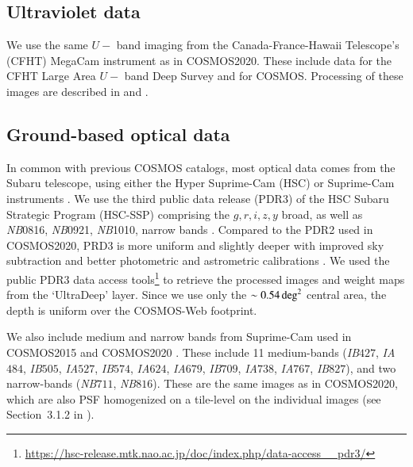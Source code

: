 \documentclass[longauth]{aa}
\begin{document}
\subsection{Ultraviolet data}
We use the same $U-$ band imaging from the Canada-France-Hawaii Telescope's (CFHT) MegaCam instrument as in COSMOS2020.  These include data  for the CFHT Large Area $U-$ band Deep Survey \citep[CLAUDS,][]{sawicki_cfht_2019} and for COSMOS. Processing of these images are described in \cite{weaver_cosmos2020_2022} and \cite{sawicki_cfht_2019}.

\subsection{Ground-based optical data}
 \label{sec:opticaldata}
In common with previous COSMOS catalogs, most optical data comes from the Subaru telescope, using either the  Hyper Suprime-Cam (HSC) or Suprime-Cam instruments \citep{2002PASJ...54..833M, 2018PASJ...70S...1M}. We use the third public data release (PDR3) of the HSC Subaru Strategic Program (HSC-SSP) comprising the $g,r,i,z,y$ broad, as well as \textit{NB}0816, \textit{NB}0921, \textit{NB}1010, narrow bands \citep{Aihara2022}. Compared to the PDR2 used in COSMOS2020, PRD3 is more uniform and slightly deeper with improved sky subtraction and better photometric and astrometric calibrations \citep{Aihara2022}. We used the public PDR3 data access tools\footnote{\url{https://hsc-release.mtk.nao.ac.jp/doc/index.php/data-access__pdr3/}} to retrieve the processed images and weight maps from the `UltraDeep' layer. Since we use only the $\sim0.54\,\rm{deg}^2$ central area, the depth is uniform over the COSMOS-Web footprint. 

We also include medium and narrow bands from Suprime-Cam used in COSMOS2015 \citep{laigle_cosmos2015_2016}
and COSMOS2020 \citep{taniguchi_cosmic_2007,taniguchi_subaru_2015}. These include 11 medium-bands (\textit{IB}$427$, \textit{IA}$484$, \textit{IB}$505$, \textit{IA}$527$, \textit{IB}$574$, \textit{IA}$624$, \textit{IA}$679$, \textit{IB}$709$, \textit{IA}$738$, \textit{IA}$767$, \textit{IB}$827$), and two narrow-bands (\textit{NB}$711$, \textit{NB}$816$). These are the same images as in COSMOS2020, which are also PSF homogenized on a tile-level on the individual images (see Section~3.1.2 in \citealt{weaver_cosmos2020_2022}). 
\end{document}
